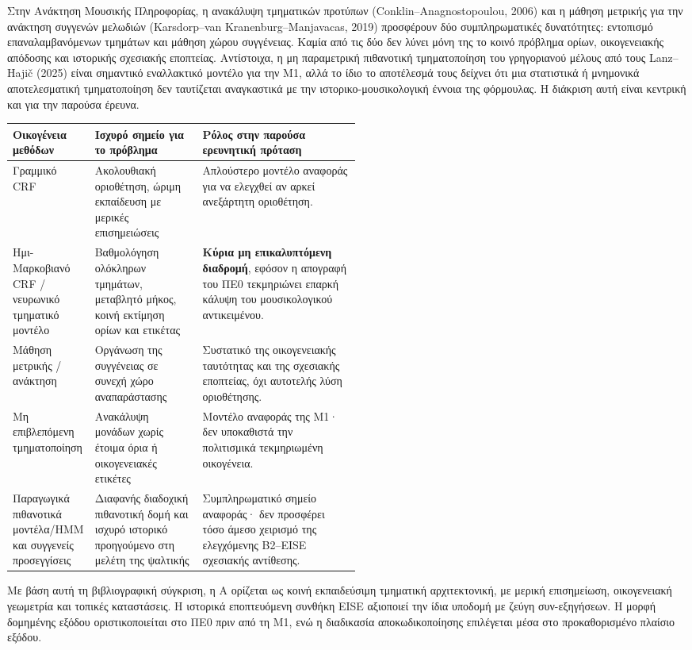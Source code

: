 \documentclass[11pt,a4paper]{article}
\begin{document}
Στην Ανάκτηση Μουσικής Πληροφορίας, η ανακάλυψη τμηματικών προτύπων (Conklin--Anagnostopoulou, 2006) και η μάθηση μετρικής για την ανάκτηση συγγενών μελωδιών (Karsdorp--van Kranenburg--Manjavacas, 2019) προσφέρουν δύο συμπληρωματικές δυνατότητες: εντοπισμό επαναλαμβανόμενων τμημάτων και μάθηση χώρου συγγένειας. Καμία από τις δύο δεν λύνει μόνη της το κοινό πρόβλημα ορίων, οικογενειακής απόδοσης και ιστορικής σχεσιακής εποπτείας. Αντίστοιχα, η μη παραμετρική πιθανοτική τμηματοποίηση του γρηγοριανού μέλους από τους Lanz--Hajič (2025) είναι σημαντικό εναλλακτικό μοντέλο για την M1, αλλά το ίδιο το αποτέλεσμά τους δείχνει ότι μια στατιστικά ή μνημονικά αποτελεσματική τμηματοποίηση δεν ταυτίζεται αναγκαστικά με την ιστορικο-μουσικολογική έννοια της φόρμουλας. Η διάκριση αυτή είναι κεντρική και για την παρούσα έρευνα.

\begin{xltabular}{0.98\linewidth}{@{}p{0.20\linewidth}p{0.31\linewidth}Y@{}}
\toprule
\textbf{Οικογένεια μεθόδων} & \textbf{Ισχυρό σημείο για το πρόβλημα} & \textbf{Ρόλος στην παρούσα ερευνητική πρόταση}\\
\midrule
Γραμμικό CRF & Ακολουθιακή οριοθέτηση, ώριμη εκπαίδευση με μερικές επισημειώσεις & Απλούστερο μοντέλο αναφοράς για να ελεγχθεί αν αρκεί ανεξάρτητη οριοθέτηση.\\
\midrule
Ημι-Μαρκοβιανό CRF / νευρωνικό τμηματικό μοντέλο & Βαθμολόγηση ολόκληρων τμημάτων, μεταβλητό μήκος, κοινή εκτίμηση ορίων και ετικέτας & \textbf{Κύρια μη επικαλυπτόμενη διαδρομή}, εφόσον η απογραφή του ΠΕ0 τεκμηριώνει επαρκή κάλυψη του μουσικολογικού αντικειμένου.\\
\midrule
Μάθηση μετρικής / ανάκτηση & Οργάνωση της συγγένειας σε συνεχή χώρο αναπαράστασης & Συστατικό της οικογενειακής ταυτότητας και της σχεσιακής εποπτείας, όχι αυτοτελής λύση οριοθέτησης.\\
\midrule
Μη επιβλεπόμενη τμηματοποίηση & Ανακάλυψη μονάδων χωρίς έτοιμα όρια ή οικογενειακές ετικέτες & Μοντέλο αναφοράς της M1· δεν υποκαθιστά την πολιτισμικά τεκμηριωμένη οικογένεια.\\
\midrule
Παραγωγικά πιθανοτικά μοντέλα/HMM και συγγενείς προσεγγίσεις & Διαφανής διαδοχική πιθανοτική δομή και ισχυρό ιστορικό προηγούμενο στη μελέτη της ψαλτικής & Συμπληρωματικό σημείο αναφοράς· δεν προσφέρει τόσο άμεσο χειρισμό της ελεγχόμενης B2--EISE σχεσιακής αντίθεσης.\\
\bottomrule
\end{xltabular}

Με βάση αυτή τη βιβλιογραφική σύγκριση, η A ορίζεται ως κοινή εκπαιδεύσιμη τμηματική αρχιτεκτονική, με μερική επισημείωση, οικογενειακή γεωμετρία και τοπικές καταστάσεις. Η ιστορικά εποπτευόμενη συνθήκη EISE αξιοποιεί την ίδια υποδομή με ζεύγη συν-εξηγήσεων. Η μορφή δομημένης εξόδου οριστικοποιείται στο ΠΕ0 πριν από τη M1, ενώ η διαδικασία αποκωδικοποίησης επιλέγεται μέσα στο προκαθορισμένο πλαίσιο εξόδου.
\end{document}
